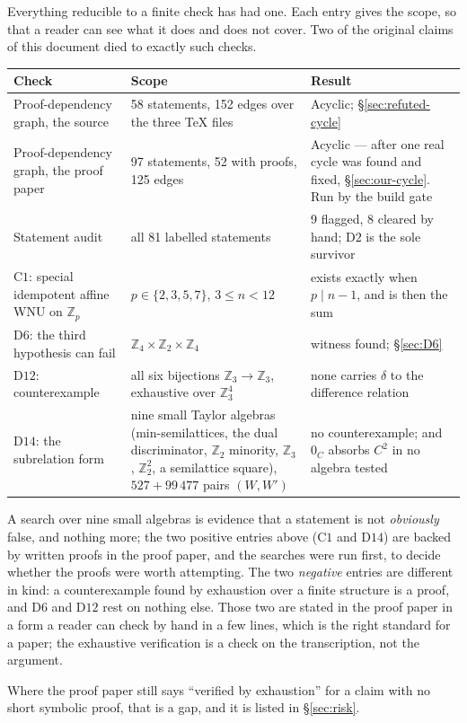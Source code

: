 Everything reducible to a finite check has had one. Each entry gives the scope,
so that a reader can see what it does and does not cover. Two of the original
claims of this document died to exactly such checks.

\begin{center}\footnotesize
\begin{tabular}{@{}p{}p{}p{}@{}}
\hline
\textbf{Check} & \textbf{Scope} & \textbf{Result} \\
\hline
Proof-dependency graph, the source & 58 statements, 152 edges over the three
  \TeX{} files & Acyclic; \S\ref{sec:refuted-cycle} \\
Proof-dependency graph, the proof paper & 97 statements, 52 with proofs, 125
  edges & Acyclic --- after one real cycle was found and fixed,
  \S\ref{sec:our-cycle}. Run by the build gate \\
Statement audit & all 81 labelled statements & 9 flagged, 8 cleared by hand;
  $\mathrm D2$ is the sole survivor \\
$\mathrm C1$: special idempotent affine WNU on $\mathbb Z_{p}$ &
  $p\in\{2,3,5,7\}$, $3\le n<12$ & exists exactly when $p\mid n-1$, and is then
  the sum \\
$\mathrm D6$: the third hypothesis can fail &
  $\mathbb Z_{4}\times\mathbb Z_{2}\times\mathbb Z_{4}$ & witness found;
  \S\ref{sec:D6} \\
$\mathrm D{12}$: counterexample & all six bijections $\mathbb Z_{3}\to
  \mathbb Z_{3}$, exhaustive over $\mathbb Z_{3}^{4}$ & none carries $\delta$
  to the difference relation \\
$\mathrm D{14}$: the subrelation form &
  nine small Taylor algebras (min-semilattices, the dual discriminator,
  $\mathbb Z_{2}$ minority, $\mathbb Z_{3}$, $\mathbb Z_{2}^{2}$, a semilattice
  square), $527+99\,477$ pairs $(W,W')$ & no counterexample; and $0_{C}$
  absorbs $C^{2}$ in no algebra tested \\
\hline
\end{tabular}
\end{center}

\begin{entry}\label{ent:search-limits}
A search over nine small algebras is evidence that a statement is not
\emph{obviously} false, and nothing more; the two positive entries above
($\mathrm C1$ and $\mathrm D14$) are backed by written proofs in the proof
paper, and the searches were run first, to decide whether the proofs were worth
attempting. The two \emph{negative} entries are different in kind: a
counterexample found by exhaustion over a finite structure is a proof, and
$\mathrm D6$ and $\mathrm D12$ rest on nothing else. Those two are stated in
the proof paper in a form a reader can check by hand in a few lines, which is
the right standard for a paper; the exhaustive verification is a check on the
transcription, not the argument.

Where the proof paper still says ``verified by exhaustion'' for a claim with no
short symbolic proof, that is a gap, and it is listed in
\S\ref{sec:risk}.
\end{entry}

